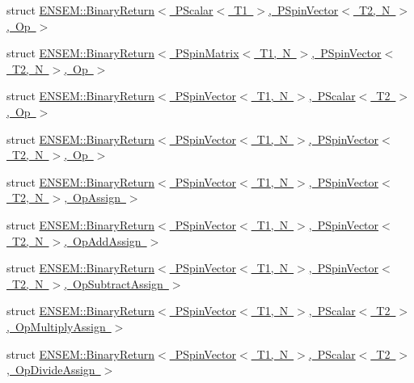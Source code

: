 \begin{DoxyCompactItemize}
\item 
struct \mbox{\hyperlink{structENSEM_1_1BinaryReturn_3_01PScalar_3_01T1_01_4_00_01PSpinVector_3_01T2_00_01N_01_4_00_01Op_01_4}{E\+N\+S\+E\+M\+::\+Binary\+Return$<$ P\+Scalar$<$ T1 $>$, P\+Spin\+Vector$<$ T2, N $>$, Op $>$}}
\item 
struct \mbox{\hyperlink{structENSEM_1_1BinaryReturn_3_01PSpinMatrix_3_01T1_00_01N_01_4_00_01PSpinVector_3_01T2_00_01N_01_4_00_01Op_01_4}{E\+N\+S\+E\+M\+::\+Binary\+Return$<$ P\+Spin\+Matrix$<$ T1, N $>$, P\+Spin\+Vector$<$ T2, N $>$, Op $>$}}
\item 
struct \mbox{\hyperlink{structENSEM_1_1BinaryReturn_3_01PSpinVector_3_01T1_00_01N_01_4_00_01PScalar_3_01T2_01_4_00_01Op_01_4}{E\+N\+S\+E\+M\+::\+Binary\+Return$<$ P\+Spin\+Vector$<$ T1, N $>$, P\+Scalar$<$ T2 $>$, Op $>$}}
\item 
struct \mbox{\hyperlink{structENSEM_1_1BinaryReturn_3_01PSpinVector_3_01T1_00_01N_01_4_00_01PSpinVector_3_01T2_00_01N_01_4_00_01Op_01_4}{E\+N\+S\+E\+M\+::\+Binary\+Return$<$ P\+Spin\+Vector$<$ T1, N $>$, P\+Spin\+Vector$<$ T2, N $>$, Op $>$}}
\item 
struct \mbox{\hyperlink{structENSEM_1_1BinaryReturn_3_01PSpinVector_3_01T1_00_01N_01_4_00_01PSpinVector_3_01T2_00_01N_01_4_00_01OpAssign_01_4}{E\+N\+S\+E\+M\+::\+Binary\+Return$<$ P\+Spin\+Vector$<$ T1, N $>$, P\+Spin\+Vector$<$ T2, N $>$, Op\+Assign $>$}}
\item 
struct \mbox{\hyperlink{structENSEM_1_1BinaryReturn_3_01PSpinVector_3_01T1_00_01N_01_4_00_01PSpinVector_3_01T2_00_01N_01_4_00_01OpAddAssign_01_4}{E\+N\+S\+E\+M\+::\+Binary\+Return$<$ P\+Spin\+Vector$<$ T1, N $>$, P\+Spin\+Vector$<$ T2, N $>$, Op\+Add\+Assign $>$}}
\item 
struct \mbox{\hyperlink{structENSEM_1_1BinaryReturn_3_01PSpinVector_3_01T1_00_01N_01_4_00_01PSpinVector_3_01T2_00_01N_01_4_00_01OpSubtractAssign_01_4}{E\+N\+S\+E\+M\+::\+Binary\+Return$<$ P\+Spin\+Vector$<$ T1, N $>$, P\+Spin\+Vector$<$ T2, N $>$, Op\+Subtract\+Assign $>$}}
\item 
struct \mbox{\hyperlink{structENSEM_1_1BinaryReturn_3_01PSpinVector_3_01T1_00_01N_01_4_00_01PScalar_3_01T2_01_4_00_01OpMultiplyAssign_01_4}{E\+N\+S\+E\+M\+::\+Binary\+Return$<$ P\+Spin\+Vector$<$ T1, N $>$, P\+Scalar$<$ T2 $>$, Op\+Multiply\+Assign $>$}}
\item 
struct \mbox{\hyperlink{structENSEM_1_1BinaryReturn_3_01PSpinVector_3_01T1_00_01N_01_4_00_01PScalar_3_01T2_01_4_00_01OpDivideAssign_01_4}{E\+N\+S\+E\+M\+::\+Binary\+Return$<$ P\+Spin\+Vector$<$ T1, N $>$, P\+Scalar$<$ T2 $>$, Op\+Divide\+Assign $>$}}

\end{DoxyCompactItemize}
